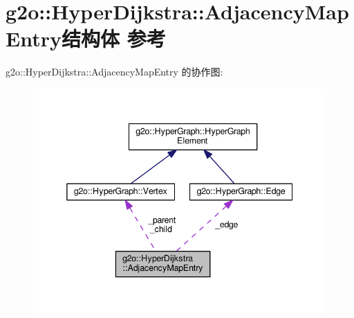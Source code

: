 \hypertarget{structg2o_1_1HyperDijkstra_1_1AdjacencyMapEntry}{\section{g2o\-:\-:Hyper\-Dijkstra\-:\-:Adjacency\-Map\-Entry结构体 参考}
\label{structg2o_1_1HyperDijkstra_1_1AdjacencyMapEntry}
}


g2o\-:\-:Hyper\-Dijkstra\-:\-:Adjacency\-Map\-Entry 的协作图\-:
\nopagebreak
\begin{figure}[H]
\begin{center}
\leavevmode
\includegraphics[width=341pt]{structg2o_1_1HyperDijkstra_1_1AdjacencyMapEntry__coll__graph}
\end{center}
\end{figure}
